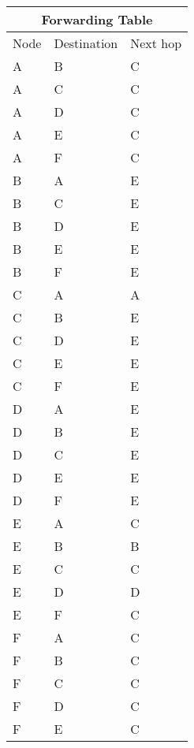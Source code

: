 \begin{tabular}{ |p{3cm}||p{3cm}|p{3cm} }
 \hline
 \multicolumn{3}{|c|}{Forwarding Table} \\
 \hline
 Node & Destination & Next hop\\
 \hline
 A  & B & C \\
 A  & C & C   \\
 A  & D & C \\
 A  & E & C \\
 A  & F & C \\

 B  & A & E \\
 B  & C & E   \\
 B  & D & E \\
 B  & E & E \\
 B  & F & E \\

 C  & A & A \\
 C  & B & E   \\
 C  & D & E \\
 C  & E & E \\
 C  & F & E \\

 D  & A & E \\
 D  & B & E   \\
 D  & C & E \\
 D  & E & E \\
 D  & F & E \\

 E  & A & C \\
 E  & B & B   \\
 E  & C & C \\
 E  & D & D \\
 E  & F & C \\

 F  & A & C \\
 F  & B & C   \\
 F  & C & C \\
 F  & D & C \\
 F  & E & C \\

 \hline
\end{tabular}